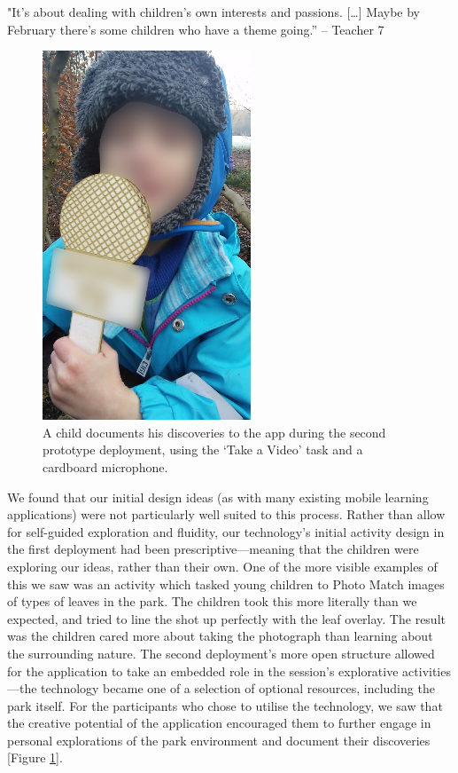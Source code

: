 \begin{displayquote}
"It’s about dealing with children’s own interests and passions. […] Maybe by February there’s some children who have a theme going.” – Teacher 7
\end{displayquote}

\begin{figure}
  \centering
  \includegraphics[width=0.4\columnwidth]{images/chapter04/microphone.png}
  \caption[A child completing a `Take a Video' Task]{A child documents his discoveries to the app during the second prototype deployment, using the `Take a Video' task and a cardboard microphone.}
  \label{fig:prototypeMicrophone}
\end{figure}

We found that our initial design ideas (as with many existing mobile learning applications) were not particularly well suited to this process. Rather than allow for self-guided exploration and fluidity, our technology’s initial activity design in the first deployment had been prescriptive—meaning that the children were exploring our ideas, rather than their own. One of the more visible examples of this we saw was an activity which tasked young children to Photo Match images of types of leaves in the park. The children took this more literally than we expected, and tried to line the shot up perfectly with the leaf overlay. The result was the children cared more about taking the photograph than learning about the surrounding nature. The second deployment’s more open structure allowed for the application to take an embedded role in the session’s explorative activities—the technology became one of a selection of optional resources, including the park itself. For the participants who chose to utilise the technology, we saw that the creative potential of the application encouraged them to further engage in personal explorations of the park environment and document their discoveries [Figure \ref{fig:prototypeMicrophone}].

